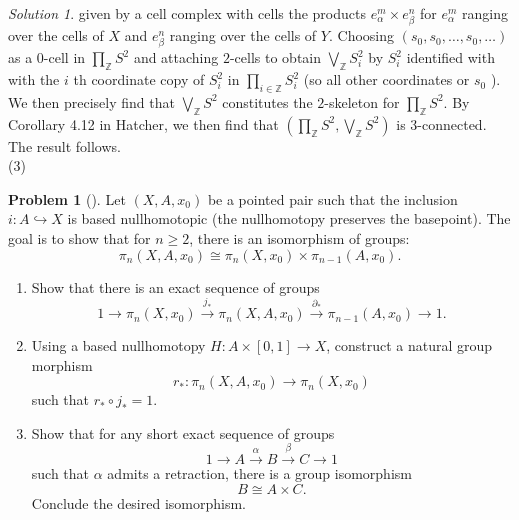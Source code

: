 \documentclass[reqno]{amsart}
\theoremstyle{definition}
\newtheorem{problem}[theorem]{Problem}
\theoremstyle{remark}
\newtheorem*{solution}{Solution}
\begin{document}
\begin{solution}
    given by a cell complex with cells
    the products $e_{\alpha}^{m} \times 
    e_{\beta}^{n}$ for $e_{\alpha}^{m}$ ranging over
    the cells of $X$ and $e_{\beta}^{n}$ ranging over the
    cells of $Y$. Choosing
    $\left( s_0, s_0, \ldots, s_0 , \ldots \right) $ as
    a $0$-cell in $\prod_{\mathbb{Z}}S^2$ and
    attaching $2 $-cells to obtain
    $\bigvee_{\mathbb{Z}}S_i^2$ by
    $S_{i}^2$ identified with
    with the $i$ th coordinate copy of
    $S_i^2$ in $\prod_{i \in \mathbb{Z}}S_i^2$ (so all other
    coordinates or $s_0$ ).
    We then precisely find that
    $\bigvee_{\mathbb{Z}} S^2$ constitutes
    the $2$-skeleton for
    $\prod_{\mathbb{Z}}S^2$. By
    Corollary 4.12 in Hatcher, we then find that
    $\left( \prod_{\mathbb{Z}} S^2, 
    \bigvee_{\mathbb{Z}} S^2 \right) $ is
    $3$-connected. The result follows.\\
    (3) 



    \end{solution}


    \begin{problem}[]
        Let $\left( X,A,x_0 \right) $ be a pointed pair
        such that the inclusion
        $i \colon A \hookrightarrow X$ is based nullhomotopic
        (the nullhomotopy preserves the basepoint). The goal
        is to show that for $n\ge 2$, there is an isomorphism
        of groups:
        \[
        \pi_n (X,A,x_0) \cong \pi_n (X,x_0) \times 
        \pi_{n-1}(A,x_0).
        \] 
        \begin{enumerate}
            \item Show that there is an exact sequence
                of groups
                \[
                1 \to \pi_n (X,x_0) 
                \stackrel{j_*}{\to} 
                \pi_n \left( X, A, x_0 \right) 
                \stackrel{\partial_*}{\to} 
                \pi_{n-1}(A,x_0) \to 1.
                \] 
            \item Using a based nullhomotopy
                $H \colon A \times \left[ 0,1 \right] 
                \to X$, construct a natural group morphism
                \[
                r_* \colon \pi_n (X,A,x_0) \to 
                \pi_n (X,x_0)
                \] 
                such that $r_* \circ j_* = 1$.
            \item Show that for any short exact sequence
                of groups
                \[
                1 \to A \stackrel{\alpha}{\to} 
                B \stackrel{\beta}{\to} C \to 1
                \] 
                such that $\alpha$ admits a retraction, there
                is a group isomorphism
                \[
                B \cong A \times C.
                \] 
                Conclude the desired isomorphism.
        \end{enumerate}
    \end{problem}
\end{document}
